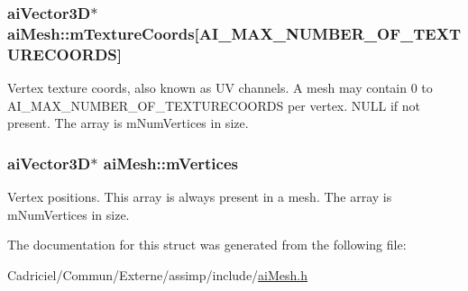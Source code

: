 \hypertarget{structai_mesh_a4a50b11d00ef50f419c75cab0f6bddd6}{
\subsubsection[{m\-Texture\-Coords}]{ {\bf ai\-Vector3\-D}$\ast$ ai\-Mesh\-::m\-Texture\-Coords\mbox{[}{\bf A\-I\-\_\-\-M\-A\-X\-\_\-\-N\-U\-M\-B\-E\-R\-\_\-\-O\-F\-\_\-\-T\-E\-X\-T\-U\-R\-E\-C\-O\-O\-R\-D\-S}\mbox{]}}}\label{structai_mesh_a4a50b11d00ef50f419c75cab0f6bddd6}
Vertex texture coords, also known as U\-V channels. A mesh may contain 0 to A\-I\-\_\-\-M\-A\-X\-\_\-\-N\-U\-M\-B\-E\-R\-\_\-\-O\-F\-\_\-\-T\-E\-X\-T\-U\-R\-E\-C\-O\-O\-R\-D\-S per vertex. N\-U\-L\-L if not present. The array is m\-Num\-Vertices in size. \hypertarget{structai_mesh_afd4588abb3e1c72821ae0234a3850662}{
\subsubsection[{m\-Vertices}]{ {\bf ai\-Vector3\-D}$\ast$ ai\-Mesh\-::m\-Vertices}}\label{structai_mesh_afd4588abb3e1c72821ae0234a3850662}
Vertex positions. This array is always present in a mesh. The array is m\-Num\-Vertices in size. 

The documentation for this struct was generated from the following file\-:\begin{DoxyCompactItemize}
\item 
Cadriciel/\-Commun/\-Externe/assimp/include/\hyperlink{ai_mesh_8h}{ai\-Mesh.\-h}\end{DoxyCompactItemize}
